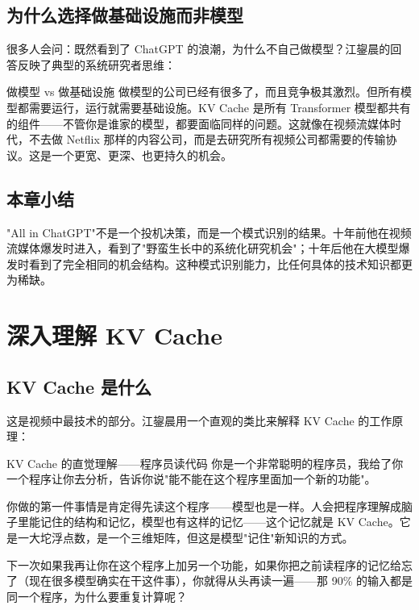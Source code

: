\documentclass[a4paper]{article}
\begin{document}
\subsection{为什么选择做基础设施而非模型}

很多人会问：既然看到了 ChatGPT 的浪潮，为什么不自己做模型？江鋆晨的回答反映了典型的系统研究者思维：

\begin{knowledgebox}{做模型 vs 做基础设施}
做模型的公司已经有很多了，而且竞争极其激烈。但所有模型都需要运行，运行就需要基础设施。KV Cache 是所有 Transformer 模型都共有的组件——不管你是谁家的模型，都要面临同样的问题。这就像在视频流媒体时代，不去做 Netflix 那样的内容公司，而是去研究所有视频公司都需要的传输协议。这是一个更宽、更深、也更持久的机会。
\end{knowledgebox}

\subsection{本章小结}

"All in ChatGPT"不是一个投机决策，而是一个模式识别的结果。十年前他在视频流媒体爆发时进入，看到了"野蛮生长中的系统化研究机会"；十年后他在大模型爆发时看到了完全相同的机会结构。这种模式识别能力，比任何具体的技术知识都更为稀缺。

\section{深入理解 KV Cache}

\subsection{KV Cache 是什么}

这是视频中最技术的部分。江鋆晨用一个直观的类比来解释 KV Cache 的工作原理：

\begin{importantbox}{KV Cache 的直觉理解——程序员读代码}
你是一个非常聪明的程序员，我给了你一个程序让你去分析，告诉你说"能不能在这个程序里面加一个新的功能"。

你做的第一件事情是肯定得先读这个程序——模型也是一样。人会把程序理解成脑子里能记住的结构和记忆，模型也有这样的记忆——这个记忆就是 KV Cache。它是一大坨浮点数，是一个三维矩阵，但这是模型"记住"新知识的方式。

下一次如果我再让你在这个程序上加另一个功能，如果你把之前读程序的记忆给忘了（现在很多模型确实在干这件事），你就得从头再读一遍——那 90\% 的输入都是同一个程序，为什么要重复计算呢？
\end{importantbox}
\end{document}
